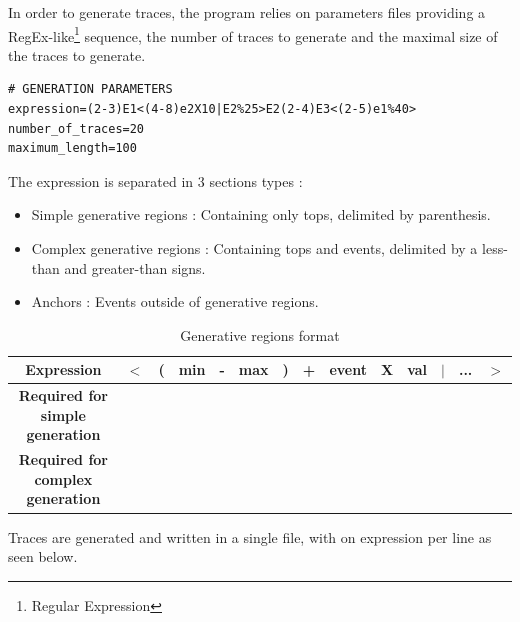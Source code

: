 \documentclass[12pt,a4paper]{article}
\begin{document}
In order to generate traces, the program relies on parameters files providing a RegEx-like\footnote{Regular Expression} sequence, the number of traces to generate and the maximal size of the traces to generate.

\begin{lstlisting}[caption={Parameter file structure}]
# GENERATION PARAMETERS
expression=(2-3)E1<(4-8)e2X10|E2%25>E2(2-4)E3<(2-5)e1%40>
number_of_traces=20
maximum_length=100
\end{lstlisting}

The expression is separated in 3 sections types :
\begin{itemize}
	\item Simple generative regions : Containing only tops, delimited by parenthesis.
	\item Complex generative regions : Containing tops and events, delimited by a less-than and greater-than signs.
	\item Anchors : Events outside of generative regions.
\end{itemize}

\begin{table}[H]
	\begin{center}
		\caption{Generative regions format}
		\begin{tabular}{|c|ccccccccccccc|}
			\hline
			\textbf{Expression} & $<$ & ( & min & - & max & ) & + & event & X & val & $|$ & ... & $>$ \\
			\hline
			\textbf{Required for simple generation} && \cellcolor{gray} & \cellcolor{gray} & \cellcolor{gray} & \cellcolor{gray} & \cellcolor{gray} &&&&&&& \\
			\hline
			\textbf{Required for complex generation} & \cellcolor{gray} & \cellcolor{gray} & \cellcolor{gray} & \cellcolor{gray} & \cellcolor{gray} & \cellcolor{gray} && \cellcolor{gray} &&&&& \cellcolor{gray} \\
			\hline
		\end{tabular}
	\end{center}
\end{table}

Traces are generated and written in a single file, with on expression per line as seen below.
\end{document}
